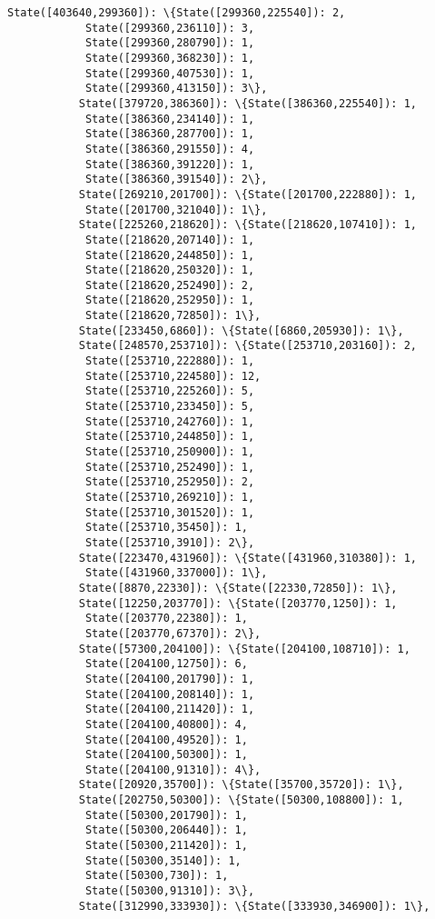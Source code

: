 \documentclass[11pt]{article}
\begin{document}
\begin{Verbatim}[commandchars=\\\{\}]
           State([403640,299360]): \{State([299360,225540]): 2,
            State([299360,236110]): 3,
            State([299360,280790]): 1,
            State([299360,368230]): 1,
            State([299360,407530]): 1,
            State([299360,413150]): 3\},
           State([379720,386360]): \{State([386360,225540]): 1,
            State([386360,234140]): 1,
            State([386360,287700]): 1,
            State([386360,291550]): 4,
            State([386360,391220]): 1,
            State([386360,391540]): 2\},
           State([269210,201700]): \{State([201700,222880]): 1,
            State([201700,321040]): 1\},
           State([225260,218620]): \{State([218620,107410]): 1,
            State([218620,207140]): 1,
            State([218620,244850]): 1,
            State([218620,250320]): 1,
            State([218620,252490]): 2,
            State([218620,252950]): 1,
            State([218620,72850]): 1\},
           State([233450,6860]): \{State([6860,205930]): 1\},
           State([248570,253710]): \{State([253710,203160]): 2,
            State([253710,222880]): 1,
            State([253710,224580]): 12,
            State([253710,225260]): 5,
            State([253710,233450]): 5,
            State([253710,242760]): 1,
            State([253710,244850]): 1,
            State([253710,250900]): 1,
            State([253710,252490]): 1,
            State([253710,252950]): 2,
            State([253710,269210]): 1,
            State([253710,301520]): 1,
            State([253710,35450]): 1,
            State([253710,3910]): 2\},
           State([223470,431960]): \{State([431960,310380]): 1,
            State([431960,337000]): 1\},
           State([8870,22330]): \{State([22330,72850]): 1\},
           State([12250,203770]): \{State([203770,1250]): 1,
            State([203770,22380]): 1,
            State([203770,67370]): 2\},
           State([57300,204100]): \{State([204100,108710]): 1,
            State([204100,12750]): 6,
            State([204100,201790]): 1,
            State([204100,208140]): 1,
            State([204100,211420]): 1,
            State([204100,40800]): 4,
            State([204100,49520]): 1,
            State([204100,50300]): 1,
            State([204100,91310]): 4\},
           State([20920,35700]): \{State([35700,35720]): 1\},
           State([202750,50300]): \{State([50300,108800]): 1,
            State([50300,201790]): 1,
            State([50300,206440]): 1,
            State([50300,211420]): 1,
            State([50300,35140]): 1,
            State([50300,730]): 1,
            State([50300,91310]): 3\},
           State([312990,333930]): \{State([333930,346900]): 1\},

\end{Verbatim}
\end{document}
